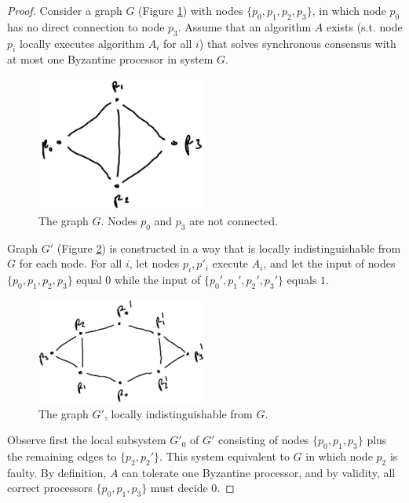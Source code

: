 \begin{proof}
Consider a graph $G$ (Figure \ref{fig:g}) with nodes $\{p_0, p_1, p_2, p_3\}$, in which
node $p_0$ has no direct connection to node $p_3$. Assume that an algorithm $A$
exists (s.t. node $p_i$ locally executes algorithm $A_i$ for all $i$)
that solves synchronous consensus with at most one Byzantine processor in system $G$.

\begin{figure}[ht]
\centering
\includegraphics[width=0.5\textwidth]{fig_g}
\caption{The graph $G$. Nodes $p_0$ and $p_3$ are not connected.} \label{fig:g}
\end{figure}

Graph $G'$ (Figure \ref{fig:gprime}) is constructed in a way that is locally
indistinguishable from $G$ for each node. For all $i$, let nodes $p_i, p'_i$ execute $A_i$,
and let the input of nodes $\{p_0, p_1, p_2, p_3\}$ equal $0$ while the input of 
$\{p_0', p_1', p_2', p_3'\}$ equals $1$.

\begin{figure}[ht]
\centering
\includegraphics[width=0.5\textwidth]{fig_gprime}
\caption{The graph $G'$, locally indistinguishable from $G$.} \label{fig:gprime}
\end{figure}

Observe first the local subsystem $G'_0$ of $G'$ consisting of nodes $\{p_0, p_1, p_3\}$
plus the remaining edges to $\{p_2, p_2'\}$. This system equivalent to $G$ in which
node $p_2$ is faulty. By definition, $A$ can tolerate one Byzantine processor,
and by validity, all correct processors $\{p_0, p_1, p_3\}$ must decide $0$.


\end{proof}
